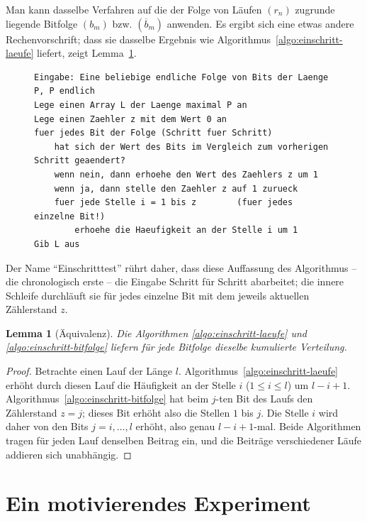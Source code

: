 \documentclass[11pt,a4paper]{scrartcl}
\theoremstyle{plain}
\newtheorem{lemma}[satz]{Lemma}
\theoremstyle{definition}
\theoremstyle{remark}
\begin{document}
\noindent Man kann dasselbe Verfahren auf die der Folge von Läufen
$(r_n)$ zugrunde liegende Bitfolge $(b_m)$ bzw.
$(\overline b_m)$ anwenden. Es ergibt sich eine etwas andere
Rechenvorschrift; dass sie dasselbe Ergebnis wie
Algorithmus~\ref{algo:einschritt-laeufe} liefert, zeigt
Lemma~\ref{lem:aequivalenz}.
\begin{figure}[htbp]
\begin{lstlisting}[caption={Einschritttest für Bitfolgen},label={algo:einschritt-bitfolge}]
Eingabe: Eine beliebige endliche Folge von Bits der Laenge P, P endlich
Lege einen Array L der Laenge maximal P an
Lege einen Zaehler z mit dem Wert 0 an
fuer jedes Bit der Folge (Schritt fuer Schritt)
    hat sich der Wert des Bits im Vergleich zum vorherigen Schritt geaendert?
    wenn nein, dann erhoehe den Wert des Zaehlers z um 1
    wenn ja, dann stelle den Zaehler z auf 1 zurueck
    fuer jede Stelle i = 1 bis z        (fuer jedes einzelne Bit!)
        erhoehe die Haeufigkeit an der Stelle i um 1
Gib L aus
\end{lstlisting}
\end{figure}
Der Name \enquote{Einschritttest} rührt daher, dass diese Auffassung
des Algorithmus -- die chronologisch erste -- die Eingabe Schritt für
Schritt abarbeitet; die innere Schleife durchläuft sie für jedes
einzelne Bit mit dem jeweils aktuellen Zählerstand $z$.

\begin{lemma}[Äquivalenz]\label{lem:aequivalenz}
Die Algorithmen \ref{algo:einschritt-laeufe} und
\ref{algo:einschritt-bitfolge} liefern für jede Bitfolge dieselbe
kumulierte Verteilung.
\end{lemma}

\begin{proof}
Betrachte einen Lauf der Länge $l$.
Algorithmus~\ref{algo:einschritt-laeufe} erhöht durch diesen Lauf die
Häufigkeit an der Stelle $i$ ($1\leq i\leq l$) um $l-i+1$.
Algorithmus~\ref{algo:einschritt-bitfolge} hat beim $j$-ten Bit des
Laufs den Zählerstand $z=j$; dieses Bit erhöht also die Stellen $1$
bis $j$. Die Stelle $i$ wird daher von den Bits $j=i,\dots,l$
erhöht, also genau $l-i+1$-mal. Beide Algorithmen tragen für jeden
Lauf denselben Beitrag ein, und die Beiträge verschiedener Läufe
addieren sich unabhängig.
\end{proof}

\section{Ein motivierendes Experiment}\label{sec:experiment}
\end{document}
